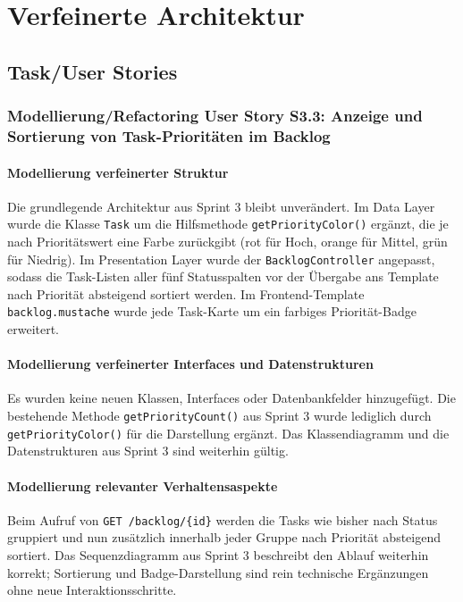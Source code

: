 \documentclass[a4paper,11pt]{article}
\begin{document}
\section{Verfeinerte Architektur}
\subsection{Task/User Stories}


\subsubsection{Modellierung/Refactoring User Story S3.3: Anzeige und Sortierung von Task-Prioritäten im Backlog}
\paragraph{Modellierung verfeinerter Struktur}
Die grundlegende Architektur aus Sprint 3 bleibt unverändert. Im Data Layer wurde die Klasse \texttt{Task} um die Hilfsmethode \texttt{getPriorityColor()} ergänzt, die je nach Prioritätswert eine Farbe zurückgibt (rot für Hoch, orange für Mittel, grün für Niedrig). Im Presentation Layer wurde der \texttt{BacklogController} angepasst, sodass die Task-Listen aller fünf Statusspalten vor der Übergabe ans Template nach Priorität absteigend sortiert werden. Im Frontend-Template \texttt{backlog.mustache} wurde jede Task-Karte um ein farbiges Priorität-Badge erweitert.

\paragraph{Modellierung verfeinerter Interfaces und Datenstrukturen}
Es wurden keine neuen Klassen, Interfaces oder Datenbankfelder hinzugefügt. Die bestehende Methode \texttt{getPriorityCount()} aus Sprint 3 wurde lediglich durch \texttt{getPriorityColor()} für die Darstellung ergänzt. Das Klassendiagramm und die Datenstrukturen aus Sprint 3 sind weiterhin gültig.

\paragraph{Modellierung relevanter Verhaltensaspekte}
Beim Aufruf von \texttt{GET /backlog/\{id\}} werden die Tasks wie bisher nach Status gruppiert und nun zusätzlich innerhalb jeder Gruppe nach Priorität absteigend sortiert. Das Sequenzdiagramm aus Sprint 3 beschreibt den Ablauf weiterhin korrekt; Sortierung und Badge-Darstellung sind rein technische Ergänzungen ohne neue Interaktionsschritte.
\end{document}

